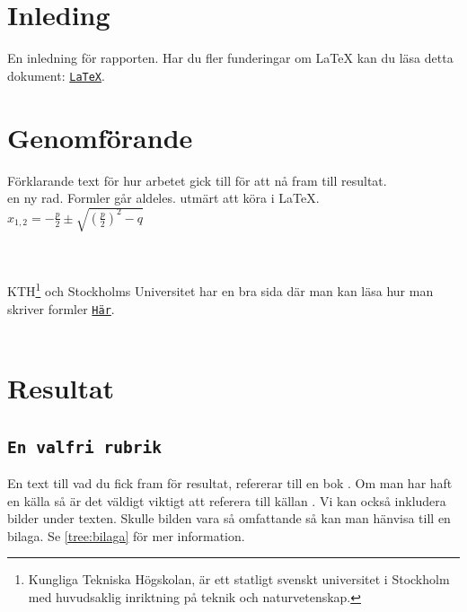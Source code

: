 





\section{Inleding}

En inledning för rapporten. Har du fler funderingar om LaTeX kan du läsa detta dokument: \href{http://upload.wikimedia.org/wikipedia/commons/2/2d/LaTeX.pdf}{\nolinkurl{LaTeX}}.

\section{Genomförande}
Förklarande text för hur arbetet gick till för att nå fram till resultat. \\ en ny rad. Formler går aldeles.
utmärt att köra i LaTeX.\\ 


\begin{math}
x_{1,2}=-\displaystyle\frac{p}{2}\pm\sqrt{\left(\displaystyle\frac{p}{2}\right)^2-q}
\end{math}


 \\  \\
KTH\footnote{Kungliga Tekniska Högskolan, är ett statligt svenskt universitet i Stockholm med huvudsaklig inriktning på teknik och naturvetenskap.} och Stockholms Universitet har en bra sida där man kan läsa hur man skriver formler \href{http://wiki.math.se/wikis/forberedandematte1/index.php/5.1_Skriva_matematiska_formler_i_LaTeX}{\nolinkurl{Här}}.
\\ \\
\newpage
\section{Resultat}
\subsection{\texttt{En valfri rubrik}}
En text till vad du fick fram för resultat, refererar till en bok \cite{einstein}.
Om man har haft en källa så är det väldigt viktigt att referera till källan \cite{einstein,latexcompanion}. Vi kan också inkludera bilder under texten.  Skulle bilden vara så omfattande så kan man hänvisa till en bilaga. Se \ref{tree:bilaga} för mer information.

